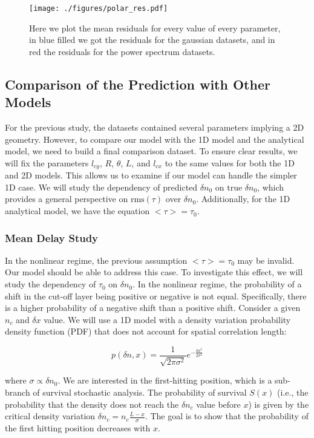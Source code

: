 \documentclass[11pt,a4paper,openany]{report}
\begin{document}
\begin{figure}[H]
    \centering
    \texttt{[image: ./figures/polar\_res.pdf]}
    \caption{Here we plot the mean residuals for every value of every parameter, in blue filled we got the residuals for the gaussian datasets, and in red the residuals for the power spectrum datasets. }
\end{figure}

\begin{multicols}{2}

    \subsection{Comparison of the Prediction with Other Models}

    For the previous study, the datasets contained several parameters implying a 2D geometry. However, to compare our model with the 1D model and the analytical model, we need to build a final comparison dataset. To ensure clear results, we will fix the parameters $l_{cy}$, $R$, $\theta$, $L$, and $l_{cx}$ to the same values for both the 1D and 2D models. This allows us to examine if our model can handle the simpler 1D case. We will study the dependency of predicted $\delta n_0$ on true $\delta n_0$, which provides a general perspective on $\text{rms}(\tau)$ over $\delta n_0$. Additionally, for the 1D analytical model, we have the equation $< \tau > = \tau_0$.

    \subsubsection{Mean Delay Study}

    In the nonlinear regime, the previous assumption $< \tau > = \tau_0$ may be invalid. Our model should be able to address this case. To investigate this effect, we will study the dependency of $\tau_0$ on $\delta n_0$. In the nonlinear regime, the probability of a shift in the cut-off layer being positive or negative is not equal. Specifically, there is a higher probability of a negative shift than a positive shift. Consider a given $n_c$ and $\delta x$ value. We will use a 1D model with a density variation probability density function (PDF) that does not account for spatial correlation length:

    $$
        p(\delta n, x) = \frac{1}{\sqrt{2 \pi \sigma^2}} e^{-\frac{\delta n^2}{2\sigma^2}}
    $$

    where $\sigma \propto \delta n_0$. We are interested in the first-hitting position, which is a sub-branch of survival stochastic analysis. The probability of survival $S(x)$ (i.e., the probability that the density does not reach the $\delta n_c$ value before $x$) is given by the critical density variation $\delta n_c = n_c \frac{L - x}{\sigma}$. The goal is to show that the probability of the first hitting position decreases with $x$.


\end{multicols}
\end{document}
